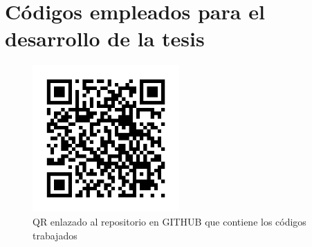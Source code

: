 


\chapter{Códigos empleados para el desarrollo de la tesis}\label{CodR}


\begin{figure}[h]
	\centering
	\includegraphics[width=0.5\textwidth]{imagenes/qr_codigo.png}
	\caption{QR enlazado al repositorio en GITHUB que contiene los códigos trabajados}
\end{figure}
